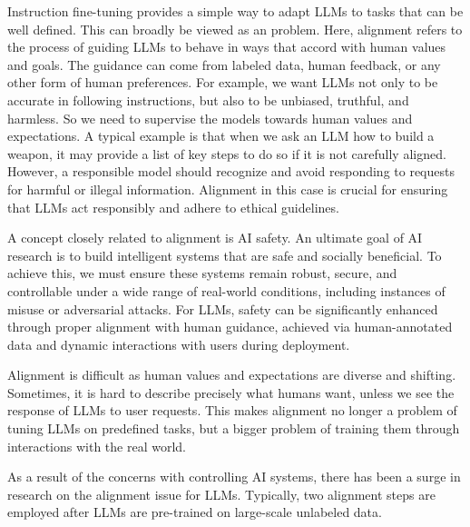 \noindent Instruction fine-tuning provides a simple way to adapt LLMs to tasks that can be well defined. This can broadly be viewed as an  problem. Here, alignment refers to the process of guiding LLMs to behave in ways that accord with human values and goals. The guidance can come from labeled data, human feedback, or any other form of human preferences. For example, we want LLMs not only to be accurate in following instructions, but also to be unbiased, truthful, and harmless. So we need to supervise the models towards human values and expectations. A typical example is that when we ask an LLM how to build a weapon, it may provide a list of key steps to do so if it is not carefully aligned. However, a responsible model should recognize and avoid responding to requests for harmful or illegal information. Alignment in this case is crucial for ensuring that LLMs act responsibly and adhere to ethical guidelines.

A concept closely related to alignment is AI safety. An ultimate goal of AI research is to build intelligent systems that are safe and socially beneficial. To achieve this, we must ensure these systems remain robust, secure, and controllable under a wide range of real-world conditions, including instances of misuse or adversarial attacks. For LLMs, safety can be significantly enhanced through proper alignment with human guidance, achieved via human-annotated data and dynamic interactions with users during deployment.

Alignment is difficult as human values and expectations are diverse and shifting. Sometimes, it is hard to describe precisely what humans want, unless we see the response of LLMs to user requests. This makes alignment no longer a problem of tuning LLMs on predefined tasks, but a bigger problem of training them through interactions with the real world.

As a result of the concerns with controlling AI systems, there has been a surge in research on the alignment issue for LLMs. Typically, two alignment steps are employed after LLMs are pre-trained on large-scale unlabeled data.

